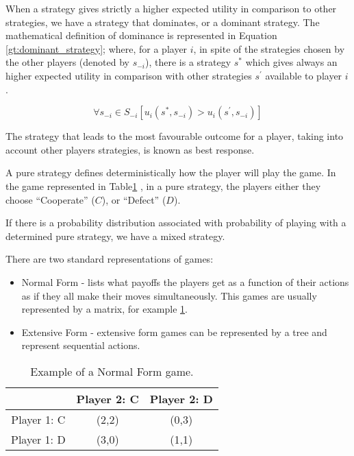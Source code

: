 When a strategy gives strictly a higher expected utility in comparison to other strategies, we have a strategy that dominates, or a dominant strategy. The mathematical definition of dominance is represented in Equation \eqref{gt:dominant_strategy}; where, for a player $i$, in spite of the strategies chosen by the other players (denoted by $s_{-i}$), there is a strategy $s^{*}$ which gives always an higher expected utility in comparison with other strategies $s^{'}$ available to player $i$.

\begin{equation}
\forall s_{-i}\in S_{-i}[u_{i}(s^{*},s_{-i})>u_{i}(s^{'},s_{-i})]
\label{gt:dominant_strategy}
\end{equation}

The strategy that leads to the most favourable outcome for a player, taking into account other players strategies, is known as best response.

A pure strategy defines deterministically how the player will play the game. In the game represented in Table\ref{tab:2prisionersdillema_tab2} , in a pure strategy, the players either they choose ``Cooperate'' ($C$), or ``Defect'' ($D$). 

If there is a probability distribution associated with probability of playing with a determined pure strategy, we have a mixed strategy. 

There are two standard representations of games:
\begin{itemize}
\item Normal Form - lists what payoffs the players get as a function of their actions as if they all make their moves simultaneously. This games are usually represented by a matrix, for example \ref{tab:2prisionersdillema_tab2}.



\item Extensive Form - extensive form games can be represented by a tree and represent sequential actions.
\end{itemize}

\begin{center}
\begin{table}[h]
\begin{centering}
\begin{tabular}{ccc}
\hline 
 & Player 2: C & Player 2: D\tabularnewline
\hline 
Player 1: C & (2,2) & (0,3)\tabularnewline
Player 1: D & (3,0) & (1,1)\tabularnewline
\hline 
\end{tabular}
\par\end{centering}

\caption{Example of a Normal Form game.}
\label{tab:2prisionersdillema_tab2}
\end{table}
\par\end{center}

